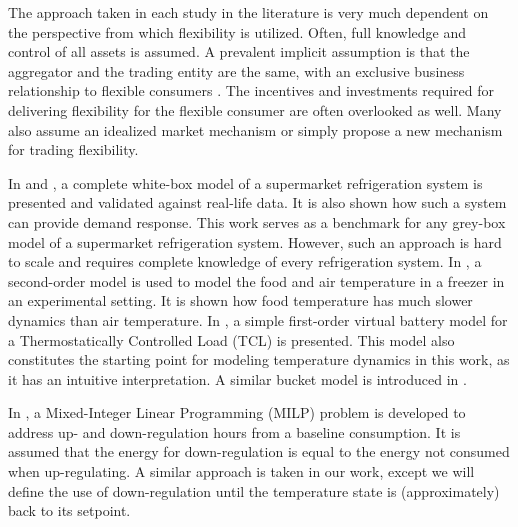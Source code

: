 The approach taken in each study in the literature is very much dependent on the perspective from which flexibility is utilized. Often, full knowledge and control of all assets is assumed. A prevalent implicit assumption is that the aggregator and the trading entity are the same, with an exclusive business relationship to flexible consumers \cite{gade2022ecosystem}. The incentives and investments required for delivering flexibility for the flexible consumer are often overlooked as well. Many also assume an idealized market mechanism or simply propose a new mechanism for trading flexibility.

In \cite{petersen2012eso2} and \cite{pedersen2013direct}, a complete white-box model of a supermarket refrigeration system is presented and validated against real-life data. It is also shown how such a system can provide demand response. This work serves as a  benchmark for any grey-box model of a supermarket refrigeration system. However, such an approach is hard to scale and requires complete knowledge of every refrigeration system. In \cite{pedersen2016improving}, a second-order model is used to model the food and air temperature in a freezer in an experimental setting. It is shown how food temperature has much slower dynamics than air temperature. In \cite{hao2014aggregate}, a simple first-order virtual battery model for a Thermostatically Controlled Load (TCL) is presented. This model also constitutes the starting point for modeling temperature dynamics in this work, as it has an intuitive interpretation. A similar bucket model is introduced in \cite{petersen2013taxonomy}.


In \cite{de2019leveraging}, a Mixed-Integer Linear Programming (MILP) problem  is developed to  address up- and down-regulation hours from a baseline consumption. It is assumed that the energy for down-regulation is equal to the energy not consumed when up-regulating. A similar approach is taken in our work, except we will define the use of down-regulation until the temperature state is (approximately) back to its setpoint.

